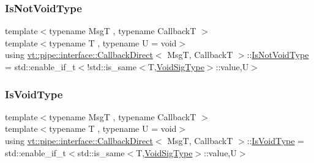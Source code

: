 \mbox{\label{structvt_1_1pipe_1_1interface_1_1_callback_direct_a619c2c4c96ec2573b87b992344c48826}} 
\subsubsection{\texorpdfstring{Is\+Not\+Void\+Type}{IsNotVoidType}}
{\footnotesize\ttfamily template$<$typename MsgT , typename CallbackT $>$ \\
template$<$typename T , typename U  = void$>$ \\
using \hyperlink{structvt_1_1pipe_1_1interface_1_1_callback_direct}{vt\+::pipe\+::interface\+::\+Callback\+Direct}$<$ MsgT, CallbackT $>$\+::\hyperlink{structvt_1_1pipe_1_1interface_1_1_callback_direct_a619c2c4c96ec2573b87b992344c48826}{Is\+Not\+Void\+Type} =  std\+::enable\+\_\+if\+\_\+t$<$!std\+::is\+\_\+same$<$T,\hyperlink{structvt_1_1pipe_1_1interface_1_1_callback_direct_ae35dd09260d13dbdd8444a208e552070}{Void\+Sig\+Type}$>$\+::value,U$>$}

\mbox{\label{structvt_1_1pipe_1_1interface_1_1_callback_direct_a404a37ff25faa985a51a410ec70b4900}} 
\subsubsection{\texorpdfstring{Is\+Void\+Type}{IsVoidType}}
{\footnotesize\ttfamily template$<$typename MsgT , typename CallbackT $>$ \\
template$<$typename T , typename U  = void$>$ \\
using \hyperlink{structvt_1_1pipe_1_1interface_1_1_callback_direct}{vt\+::pipe\+::interface\+::\+Callback\+Direct}$<$ MsgT, CallbackT $>$\+::\hyperlink{structvt_1_1pipe_1_1interface_1_1_callback_direct_a404a37ff25faa985a51a410ec70b4900}{Is\+Void\+Type} =  std\+::enable\+\_\+if\+\_\+t$<$std\+::is\+\_\+same$<$T,\hyperlink{structvt_1_1pipe_1_1interface_1_1_callback_direct_ae35dd09260d13dbdd8444a208e552070}{Void\+Sig\+Type}$>$\+::value,U$>$}


